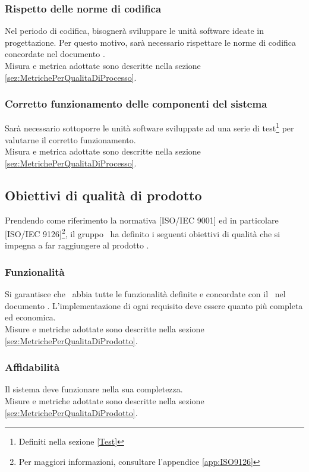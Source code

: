 \documentclass[../PianoDiQualifica.tex]{subfiles}
\begin{document}
			\subsubsection{Rispetto delle norme di codifica}
				Nel periodo di codifica, bisognerà sviluppare le unità software ideate in
				progettazione. Per questo motivo, sarà necessario rispettare le norme di codifica
				concordate nel documento \normediprogetto.\\
				Misura e metrica adottate sono descritte nella sezione \ref{sez:MetrichePerQualitaDiProcesso}.
			\subsubsection{Corretto funzionamento delle componenti del sistema}
				Sarà necessario sottoporre le unità software sviluppate ad una serie di test\footnote{Definiti nella sezione \ref{Test}}
				per valutarne il corretto funzionamento.\\
				Misura e metrica adottate sono descritte nella sezione \ref{sez:MetrichePerQualitaDiProcesso}.
		\subsection{Obiettivi di qualità di prodotto}\label{sez:obiettiviQualitaProdotto}
			Prendendo come riferimento la normativa [ISO/IEC 9001] ed in particolare
			[ISO/IEC 9126]\footnote{Per maggiori informazioni, consultare l'appendice
			\ref{app:ISO9126}}, il gruppo \kaleidoscode\ ha definito i seguenti obiettivi di
			qualità che si impegna a far raggiungere al prodotto \progetto.
			\subsubsection{Funzionalità}
				Si garantisce che \progetto\ abbia tutte le funzionalità
				definite e concordate con il \proponente\ nel documento
				\analisideirequisitiv. L'implementazione di
				ogni requisito deve essere quanto più completa ed economica.\\
				Misure e metriche adottate sono descritte nella sezione \ref{sez:MetrichePerQualitaDiProdotto}.
			\subsubsection{Affidabilità}
				Il sistema deve funzionare nella sua completezza.\\
				Misure e metriche adottate sono descritte nella sezione \ref{sez:MetrichePerQualitaDiProdotto}.
\end{document}
